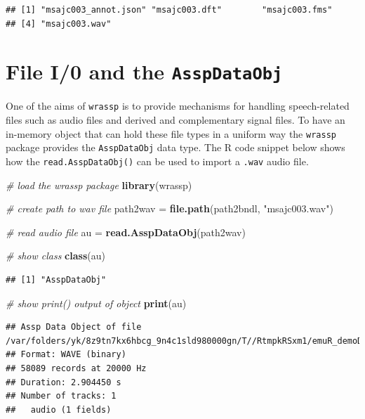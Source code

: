 \documentclass[]{book}
\newenvironment{Shaded}{\begin{snugshade}}{\end{snugshade}}
\newcommand{\CommentTok}[1]{\textcolor[rgb]{0.56,0.35,0.01}{\textit{#1}}}
\newcommand{\KeywordTok}[1]{\textcolor[rgb]{0.13,0.29,0.53}{\textbf{#1}}}
\newcommand{\NormalTok}[1]{#1}
\newcommand{\StringTok}[1]{\textcolor[rgb]{0.31,0.60,0.02}{#1}}
\theoremstyle{definition}
\theoremstyle{definition}
\theoremstyle{definition}
\theoremstyle{remark}
\begin{document}
\begin{verbatim}
## [1] "msajc003_annot.json" "msajc003.dft"        "msajc003.fms"       
## [4] "msajc003.wav"
\end{verbatim}

\hypertarget{file-i0-and-the-asspdataobj}{%
\section{\texorpdfstring{File I/0 and the
\texttt{AsspDataObj}}{File I/0 and the AsspDataObj}}\label{file-i0-and-the-asspdataobj}}

One of the aims of \texttt{wrassp} is to provide mechanisms for handling
speech-related files such as audio files and derived and complementary
signal files. To have an in-memory object that can hold these file types
in a uniform way the \texttt{wrassp} package provides the
\texttt{AsspDataObj} data type. The R code snippet below shows how the
\texttt{read.AsspDataObj()} can be used to import a \texttt{.wav} audio
file.

\begin{Shaded}
\begin{Highlighting}[]
\CommentTok{# load the wrassp package}
\KeywordTok{library}\NormalTok{(wrassp)}

\CommentTok{# create path to wav file}
\NormalTok{path2wav =}\StringTok{ }\KeywordTok{file.path}\NormalTok{(path2bndl, }\StringTok{"msajc003.wav"}\NormalTok{)}

\CommentTok{# read audio file}
\NormalTok{au =}\StringTok{ }\KeywordTok{read.AsspDataObj}\NormalTok{(path2wav)}

\CommentTok{# show class}
\KeywordTok{class}\NormalTok{(au)}
\end{Highlighting}
\end{Shaded}

\begin{verbatim}
## [1] "AsspDataObj"
\end{verbatim}

\begin{Shaded}
\begin{Highlighting}[]
\CommentTok{# show print() output of object}
\KeywordTok{print}\NormalTok{(au)}
\end{Highlighting}
\end{Shaded}

\begin{verbatim}
## Assp Data Object of file /var/folders/yk/8z9tn7kx6hbcg_9n4c1sld980000gn/T//RtmpkRSxm1/emuR_demoData/ae_emuDB/0000_ses/msajc003_bndl/msajc003.wav.
## Format: WAVE (binary)
## 58089 records at 20000 Hz
## Duration: 2.904450 s
## Number of tracks: 1 
##   audio (1 fields)
\end{verbatim}
\end{document}
